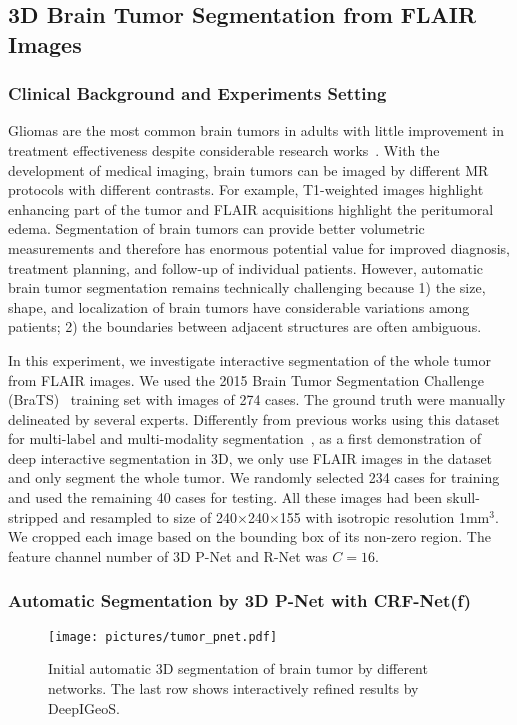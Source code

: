 \documentclass[10pt,journal,compsoc]{IEEEtran}
\begin{document}
\subsection{3D Brain Tumor Segmentation from FLAIR Images }
\subsubsection{Clinical Background and Experiments Setting}
Gliomas are the most common brain tumors in adults with little improvement in treatment effectiveness despite considerable research works~\cite{Menze2015a}. With the development of medical imaging, brain tumors can be imaged by different MR protocols with different contrasts. For example, T1-weighted images highlight enhancing part of the tumor and FLAIR acquisitions highlight the peritumoral edema. Segmentation of brain tumors can provide better volumetric measurements and therefore has enormous potential value for improved diagnosis, treatment planning, and follow-up of individual patients. However, automatic brain tumor segmentation remains technically challenging because 1) the size, shape, and localization of brain tumors have considerable variations among patients; 2) the boundaries between adjacent structures are often ambiguous. 


In this experiment, we investigate interactive segmentation of the whole tumor from FLAIR images. We used the 2015 Brain Tumor Segmentation Challenge (BraTS)~\cite{Menze2015a} training set with images of 274 cases. The ground truth were manually delineated by several experts. Differently from previous works using this dataset for multi-label and multi-modality segmentation~\cite{Kamnitsas2017,Fidon2017a}, as a first demonstration of deep interactive segmentation in 3D, we only use FLAIR images in the dataset and only segment the whole tumor. We randomly selected 234 cases for training and used the remaining 40 cases for testing. All these images had been skull-stripped and resampled to size of 240$\times$240$\times$155 with isotropic resolution 1mm$^3$. We cropped each image based on the bounding box of its non-zero region. The feature channel number of 3D P-Net and R-Net was $C = 16$. 
 
\subsubsection{Automatic Segmentation by 3D P-Net with CRF-Net(f)}


\begin{figure}[t]
	\centering
	\texttt{[image: pictures/tumor\_pnet.pdf]}
	\caption[Initial automatic 3D segmentation of brain tumor]{ 
		Initial automatic 3D segmentation of brain tumor by different networks. %
		The last row shows interactively refined results by DeepIGeoS.
	} 
	\label{fig:tumor_p_net}
\end{figure}
\end{document}
